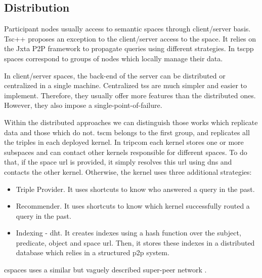 



\subsection{Distribution} %
\label{sec:soa_tsc_distribution}

Participant nodes usually access to semantic spaces through client/server basis.
Tsc++\citep{krummenacher_open_2009,blunder_distributed_2009} proposes an exception to the client/server access to the space.
It relies on the Jxta P2P framework  to propagate queries using different strategies.
In \acs{tscpp} spaces correspond to groups of nodes which locally manage their data.


In client/server spaces, the back-end of the server can be distributed or centralized in a single machine.
Centralized \aclp{ts} are much simpler and easier to implement.
Therefore, they usually offer more features than the distributed ones.
However, they also impose a single-point-of-failure.


Within the distributed approaches we can distinguish those works which replicate data and those which do not.
\acs{tscm} belongs to the first group, and replicates all the triples in each deployed kernel.
In \ac{tripcom} each kernel stores one or more subspaces and can contact other kernels responsible for different spaces.
To do that, if the space \ac{url} is provided, it simply resolves this \ac{url} using \ac{dns} and contacts the other kernel.
Otherwise, the kernel uses three additional strategies:
\begin{itemize}
  \item Triple Provider.
	It uses shortcuts to know who answered a query in the past.
  \item Recommender.
	It uses shortcuts to know which kernel successfully routed a query in the past.
  \item Indexing - \ac{dht}.
	It creates indexes using a hash function over the subject, predicate, object and space \ac{url}.
	Then, it stores these indexes in a distributed database which relies in a structured \ac{p2p} system. %
\end{itemize}
\ac{cspaces} uses a similar but vaguely described super-peer network \citep{martinrecuerda_application_2006}.



